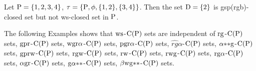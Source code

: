 \begin{exm}\label{exam2.2.13}
Let $\mathrm{P} = \{1, 2, 3, 4\}$, $\tau = \{\mathrm{P}, \phi, \{1, 2\}, \{3, 4\}\}$. Then the set $\mathrm{D}= \{2\}$ is gsp(rgb)-closed set but not ws-closed set in $\mathrm{P}$.
\end{exm}

\begin{rem}\label{rem2.2.14}
The following Examples shows that $\mathrm{ws}$-$\mathrm{C}(\mathrm{P})$ sets are independent of $\mathrm{rg}$-$\mathrm{C}(\mathrm{P})$ sets, $\mathrm{gpr}$-$\mathrm{C}(\mathrm{P})$ sets, $\mathrm{wgr}\alpha$-$\mathrm{C}(\mathrm{P})$ sets, $\mathrm{pgr}\alpha$-$\mathrm{C}(\mathrm{P})$ sets, $\widehat{rg}\alpha$-$\mathrm{C}(\mathrm{P})$ sets, $\alpha{*}{*}\mathrm{g}$-$\mathrm{C}(\mathrm{P})$ sets, $\mathrm{gprw}$-$\mathrm{C}(\mathrm{P})$ sets, $\mathrm{rgw}$-$\mathrm{C}(\mathrm{P})$ sets, $\mathrm{rw}$-$\mathrm{C}(\mathrm{P})$ sets, $\mathrm{rwg}$-$\mathrm{C}(\mathrm{P})$ sets, $\mathrm{rg}\alpha$-$\mathrm{C}(\mathrm{P})$ sets, $\alpha\mathrm{gr}$-$\mathrm{C}(\mathrm{P})$ sets, $\mathrm{g}\alpha {*}{*}$-$\mathrm{C}(\mathrm{P})$ sets, $\beta \mathrm{wg}{*}{*}$-$\mathrm{C}(\mathrm{P})$ sets.
\end{rem}

